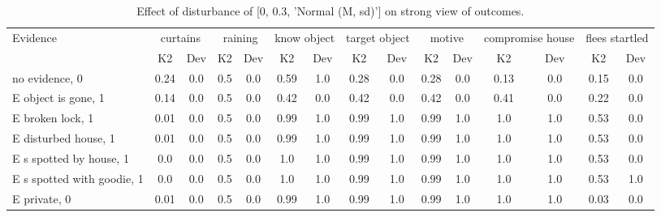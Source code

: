 \begin{table}\begin{tabular}{l|cc|cc|cc|cc|cc|cc|cc}\toprule\multirow{2}{*}{Evidence} & \multicolumn{2}{c}{curtains}& \multicolumn{2}{c}{raining}& \multicolumn{2}{c}{know object}& \multicolumn{2}{c}{target object}& \multicolumn{2}{c}{motive}& \multicolumn{2}{c}{compromise house}& \multicolumn{2}{c}{flees startled}\\& {K2} & {Dev}& {K2} & {Dev}& {K2} & {Dev}& {K2} & {Dev}& {K2} & {Dev}& {K2} & {Dev}& {K2} & {Dev}\\\midrule
no evidence, 0 & \cellcolor{Bittersweet}0.24&\cellcolor{Bittersweet}0.0&0.5&0.0&\cellcolor{Bittersweet}0.59&\cellcolor{Bittersweet}1.0&\cellcolor{Bittersweet}0.28&\cellcolor{Bittersweet}0.0&\cellcolor{Bittersweet}0.28&\cellcolor{Bittersweet}0.0&\cellcolor{Bittersweet}0.13&\cellcolor{Bittersweet}0.0&\cellcolor{Bittersweet}0.15&\cellcolor{Bittersweet}0.0\\E object is gone, 1 & \cellcolor{Bittersweet}0.14&\cellcolor{Bittersweet}0.0&0.5&0.0&0.42&0.0&0.42&0.0&0.42&0.0&0.41&0.0&\cellcolor{Bittersweet}0.22&\cellcolor{Bittersweet}0.0\\E broken lock, 1 & \cellcolor{Bittersweet}0.01&\cellcolor{Bittersweet}0.0&0.5&0.0&\cellcolor{Bittersweet}0.99&\cellcolor{Bittersweet}1.0&\cellcolor{Bittersweet}0.99&\cellcolor{Bittersweet}1.0&\cellcolor{Bittersweet}0.99&\cellcolor{Bittersweet}1.0&\cellcolor{Bittersweet}1.0&\cellcolor{Bittersweet}1.0&\cellcolor{Bittersweet}0.53&\cellcolor{Bittersweet}0.0\\E disturbed house, 1 & \cellcolor{Bittersweet}0.01&\cellcolor{Bittersweet}0.0&0.5&0.0&\cellcolor{Bittersweet}0.99&\cellcolor{Bittersweet}1.0&\cellcolor{Bittersweet}0.99&\cellcolor{Bittersweet}1.0&\cellcolor{Bittersweet}0.99&\cellcolor{Bittersweet}1.0&\cellcolor{Bittersweet}1.0&\cellcolor{Bittersweet}1.0&0.53&0.0\\E s spotted by house, 1 & \cellcolor{Bittersweet}0.0&\cellcolor{Bittersweet}0.0&0.5&0.0&\cellcolor{Bittersweet}1.0&\cellcolor{Bittersweet}1.0&\cellcolor{Bittersweet}0.99&\cellcolor{Bittersweet}1.0&\cellcolor{Bittersweet}0.99&\cellcolor{Bittersweet}1.0&\cellcolor{Bittersweet}1.0&\cellcolor{Bittersweet}1.0&0.53&0.0\\E s spotted with goodie, 1 & \cellcolor{Bittersweet}0.0&\cellcolor{Bittersweet}0.0&0.5&0.0&\cellcolor{Bittersweet}1.0&\cellcolor{Bittersweet}1.0&\cellcolor{Bittersweet}0.99&\cellcolor{Bittersweet}1.0&\cellcolor{Bittersweet}0.99&\cellcolor{Bittersweet}1.0&\cellcolor{Bittersweet}1.0&\cellcolor{Bittersweet}1.0&0.53&1.0\\E private, 0 & \cellcolor{Bittersweet}0.01&\cellcolor{Bittersweet}0.0&0.5&0.0&\cellcolor{Bittersweet}0.99&\cellcolor{Bittersweet}1.0&\cellcolor{Bittersweet}0.99&\cellcolor{Bittersweet}1.0&\cellcolor{Bittersweet}0.99&\cellcolor{Bittersweet}1.0&\cellcolor{Bittersweet}1.0&\cellcolor{Bittersweet}1.0&\cellcolor{Bittersweet}0.03&\cellcolor{Bittersweet}0.0\\\bottomrule\end{tabular}\caption{Effect of disturbance of [0, 0.3, 'Normal (M, sd)'] on strong view of outcomes.}\end{table}